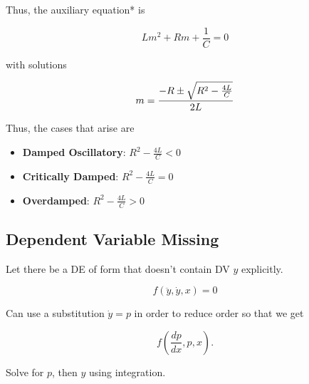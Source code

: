 Thus, the auxiliary equation* is

\begin{equation*}
    Lm^2+Rm+\frac{1}{C}=0
\end{equation*}

with solutions

\begin{equation*}
    m=\frac{-R\pm \sqrt{R^2-\frac{4L}{C}}}{2L}\\
\end{equation*}

Thus, the cases that arise are
\begin{itemize}
    \item \textbf{Damped Oscillatory}: $R^2-\frac{4L}{C}<0$
    \item \textbf{Critically Damped}: $R^2-\frac{4L}{C}=0$
    \item \textbf{Overdamped}: $R^2-\frac{4L}{C}>0$
\end{itemize}

\subsection{Dependent Variable Missing}

Let there be a DE of form that doesn't contain DV $y$ explicitly.

\begin{equation*}
    f(\ddot y,\dot y,x)=0
\end{equation*}

Can use a substitution $\dot y= p$ in order to reduce order so that we get

\begin{equation*}
    f(\frac{dp}{dx}, p,x).
\end{equation*}

Solve for $p$, then $y$ using integration.